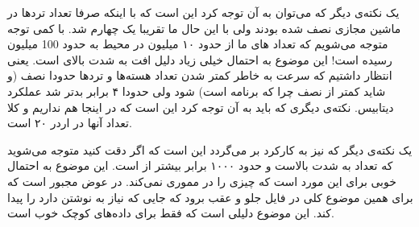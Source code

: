 یک نکته‌ی دیگر که می‌توان به آن توجه کرد این است که با اینکه صرفا تعداد ترد‌ها در ماشین
مجازی نصف شده بودند ولی با این حال
ما تقریبا یک چهارم شد. با کمی توجه متوجه می‌شویم که تعداد
های
ما از حدود ۱۰ میلیون در محیط
به حدود
100 میلیون رسیده است!
این موضوع به احتمال خیلی زیاد دلیل افت به شدت بالای
است. یعنی انتظار داشتیم که سرعت به خاطر کمتر شدن تعداد هسته‌ها و ترد‌ها حدودا نصف
(و شاید کمتر از نصف چرا که برنامه  است)
شود ولی حدودا ۴ برابر بدتر شد عملکرد دیتابیس. نکته‌ی دیگری که باید به آن توجه کرد این است که
در اینجا
هم نداریم و کلا تعداد آنها در اردر ۲۰ است.

یک نکته‌ی دیگر که نیز به کارکرد
بر می‌گردد این است که اگر دقت کنید متوجه می‌شوید که تعداد
به شدت بالاست و حدود ۱۰۰۰ برابر بیشتر از
است. این موضوع به احتمال خوبی برای این مورد است که
چیزی را در مموری
نمی‌کند. در عوض مجبور است که برای همین موضوع کلی در فایل جلو و عقب برود که جایی
که نیاز به نوشتن دارد را پیدا کند. این موضوع دلیلی است که
فقط برای داده‌های کوچک خوب است.